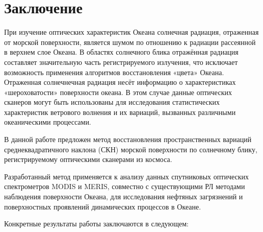 \chapter*{Заключение}						%


При изучение оптических характеристик Океана солнечная радиация, отраженная от морской поверхности, является шумом по отношению к радиации рассеянной в верхнем слое Океана. В областях солнечного блика отражённая радиация составляет значительную часть регистрируемого излучения, что исключает возможность применения алгоритмов восстановления «цвета» Океана. Отраженная солнечнечная радиация несёт информацию о характеристиках «шероховатости» поверхности океана. В этом случае данные оптических сканеров могут быть использованы для исследования статистических характеристик ветрового волнения и их вариаций, вызванных различными океаническими процессами. 

В данной работе предложен метод восстановления пространственных вариаций среднеквадратичного наклона (СКН) морской поверхности по солнечному блику, регистрируемому оптическими сканерами из космоса.

Разработанный метод применяется к анализу данных спутниковых оптических спектрометров MODIS и MERIS, совместно с существующими РЛ методами наблюдения поверхности Океана, для исследования нефтяных загрязнений и поверхностных проявлений динамических процессов в Океане.

Конкретные результаты работы заключаются в следующем:

